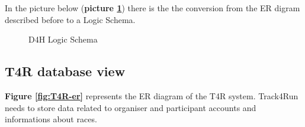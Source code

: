 In the picture below (\textbf{picture \ref{fig:D4H-Logic-Schema}}) there is the the conversion from the ER digram described before to a Logic Schema.

\begin{figure}[H]
    \centering
    \caption{D4H Logic Schema}
    \label{fig:D4H-Logic-Schema}
\end{figure}


\subsection{T4R database view}

\textbf{Figure \ref{fig:T4R-er}} represents the ER diagram of the T4R system. Track4Run needs to store data related to organiser and participant accounts and informations about races.

